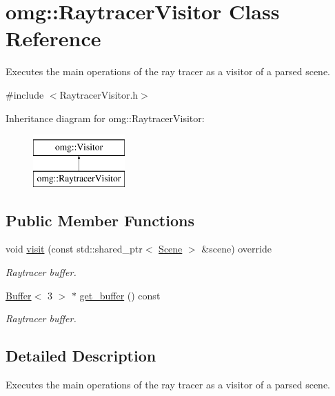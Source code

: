 \hypertarget{classomg_1_1_raytracer_visitor}{}\section{omg\+::Raytracer\+Visitor Class Reference}
\label{classomg_1_1_raytracer_visitor}


Executes the main operations of the ray tracer as a visitor of a parsed scene.  




{\ttfamily \#include $<$Raytracer\+Visitor.\+h$>$}

Inheritance diagram for omg\+::Raytracer\+Visitor\+:\begin{figure}[H]
\begin{center}
\leavevmode
\includegraphics[height=2.000000cm]{classomg_1_1_raytracer_visitor}
\end{center}
\end{figure}
\subsection*{Public Member Functions}
\begin{DoxyCompactItemize}
\item 
void \mbox{\hyperlink{classomg_1_1_raytracer_visitor_ac469c21e8ac5e9a01ca6a58108bc860e}{visit}} (const std\+::shared\+\_\+ptr$<$ \mbox{\hyperlink{classomg_1_1_scene}{Scene}} $>$ \&scene) override
\begin{DoxyCompactList}\small\item\em Raytracer buffer. \end{DoxyCompactList}\item 
\mbox{\hyperlink{classomg_1_1_buffer}{Buffer}}$<$ 3 $>$ $\ast$ \mbox{\hyperlink{classomg_1_1_raytracer_visitor_a02b6a31ad96feae340a34be792fa698e}{get\+\_\+buffer}} () const
\begin{DoxyCompactList}\small\item\em Raytracer buffer. \end{DoxyCompactList}\end{DoxyCompactItemize}


\subsection{Detailed Description}
Executes the main operations of the ray tracer as a visitor of a parsed scene. 

